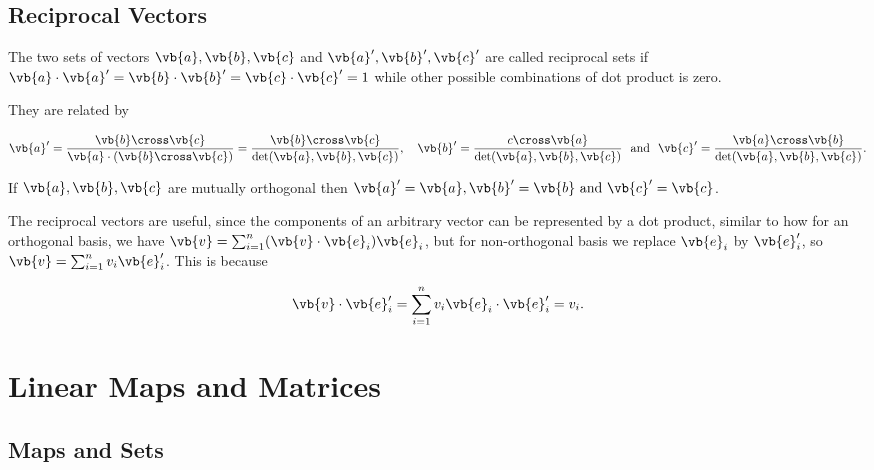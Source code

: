 \documentclass[a4paper,12pt]{report}
\begin{document}

\section{Reciprocal Vectors}

The two sets of vectors \(\vb{a} ,\vb{b}, \vb{c} \) and \(\vb{a} ', \vb{b} ', \vb{c} '\) are called reciprocal sets if \(\vb{a} \cdot \vb{a} ' = \vb{b} \cdot \vb{b} ' = \vb{c} \cdot \vb{c} ' = 1\) while other possible combinations of dot product is zero. 

They are related by 

\begin{equation}
    \vb{a} ' = \frac{\vb{b} \cross \vb{c} }{\vb{a} \cdot (\vb{b} \cross \vb{c} )} = \frac{\vb{b} \cross \vb{c} }{\det (\vb{a} , \vb{b} , \vb{c} )}, \quad \vb{b} ' = \frac{c \cross \vb{a} }{\det (\vb{a} ,\vb{b} ,\vb{c} )} ~\text { and }~ \vb{c} '= \frac{\vb{a} \cross \vb{b} }{\det (\vb{a} ,\vb{b} ,\vb{c} )}.   
\end{equation}

If \(\vb{a} ,\vb{b} ,\vb{c} \) are mutually orthogonal then \(\vb{a} ' = \vb{a} , \vb{b} ' = \vb{b} \text { and } \vb{c} '=\vb{c} \).  

The reciprocal vectors are useful, since the components of an arbitrary vector can be represented by a dot product, similar to how for an orthogonal basis, we have \(\vb{v} = \sum_{i=1}^{n} (\vb{v} \cdot \vb{e} _{i}  ) \vb{e} _{i}  \), but for non-orthogonal basis we replace \(\vb{e} _{i}\) by \( \vb{e} _{i}'  \), so \(\vb{v} = \sum_{i=1}^{n} v_{i}\vb{e} '_{i}  \). This is because

\begin{equation}
    \vb{v} \cdot \vb{e} '_{i} = \sum_{i=1}^{n} v_{i} \vb{e} _{i} \cdot \vb{e} '_{i} = v_{i}.       
\end{equation}







\chapter{Linear Maps and Matrices}

\section{Maps and Sets}
\end{document}
